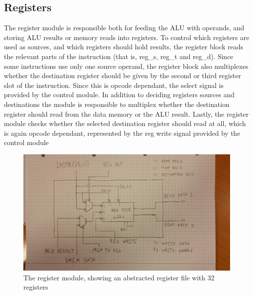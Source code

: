 \subsection{Registers}

The register module is responsible both for feeding the ALU with operands, and storing ALU results or memory reads into registers.
To control which registers are used as sources, and which registers should hold results, the register block reads the relevant parts of the instruction (that is, reg\_s, reg\_t and reg\_d). 
Since some instructions use only one source operand, the register block also multiplexes whether the destination register should be given by the second or third register slot of the instruction. Since this is opcode dependant, the select signal is provided by the control module.
In addition to deciding registers sources and destinations the module is responsible to multiplex whether the destination register should read from the data memory or the ALU result.
Lastly, the register module checks whether the selected destination register should read at all, which is again opcode dependant, represented by the reg write signal provided by the control module

\begin{figure}[h!]
    \includegraphics[width=\linewidth]{img/regs.jpg}
    \caption{The register module, showing an abstracted register file with 32 registers}
    \label{fig:registers}
\end{figure}
